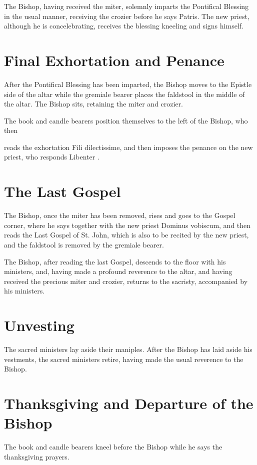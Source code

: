 \documentclass{report}
\begin{document}
{	The Bishop, having received the miter, solemnly imparts the Pontifical
	Blessing in the usual manner, receiving the crozier before he says Patris.
	The new priest, although he is concelebrating, receives the blessing
	kneeling and signs himself.

	\section{Final Exhortation and Penance}

	After the Pontifical Blessing has been imparted, the Bishop moves to the
	Epistle side of the altar while the gremiale bearer places the faldstool in
	the middle of the altar. The Bishop sits, retaining the miter and crozier.

	The book and candle bearers position themselves to the left of the Bishop,
	who then

	reads the exhortation Fili dilectissime, and then imposes the penance on
	the new priest, who responds Libenter .

	\section{The Last Gospel}

	The Bishop, once the miter has been removed, rises and goes to the Gospel
	corner, where he says together with the new priest Dominus vobiscum, and
	then reads the Last Gospel of St. John, which is also to be recited by the
	new priest, and the faldstool is removed by the gremiale bearer.

	The Bishop, after reading the last Gospel, descends to the floor with his
	ministers, and, having made a profound reverence to the altar, and having
	received the precious miter and crozier, returns to the sacristy,
	accompanied by his ministers.

	\section{Unvesting}

	The sacred ministers lay aside their maniples. After the Bishop has laid
	aside his vestments, the sacred ministers retire, having made the usual
	reverence to the Bishop.

	\section{Thanksgiving and Departure of the Bishop}

	The book and candle bearers kneel before the Bishop while he says the
	thanksgiving prayers.

	}
\end{document}
